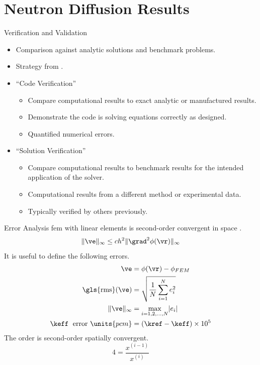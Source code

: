 \section{Neutron Diffusion Results}
\label{sec:diffusionResults}

\begin{frame}{Verification and Validation}
  \begin{itemize}
    \item Comparison against analytic solutions and benchmark problems.
    \item Strategy from \cite{oberkampf}.
    \item ``Code Verification''
      \begin{itemize}
        \item Compare computational results to exact analytic or manufactured
          results.
        \item Demonstrate the code is solving equations correctly as designed.
        \item Quantified numerical errors.
      \end{itemize}
    \item ``Solution Verification''
      \begin{itemize}
        \item Compare computational results to benchmark results for the
          intended application of the solver.
        \item Computational results from a different method or experimental
          data.
        \item Typically verified by others previously.
      \end{itemize}
  \end{itemize}
\end{frame}

\begin{frame}{Error Analysis}
  \gls{fem} with linear elements is second-order convergent in space
  \cite{textbookli}.
  \begin{equation} 
    \label{eq:error_bound}
    \|\ve\|_{\infty} \le c h^2 \| \grad^2 \phi(\vr) \|_{\infty}
  \end{equation}
  It is useful to define the following errors.
  \begin{align}
    \ve &= \phi(\vr) - \phi_{FEM} \\
    \label{eq:rms}
    \text{\gls{rms}}(\ve) &= \sqrt{\frac{1}{N} \sum_{i=1}^{N} e_i^2} \\
    \label{eq:infnorm}
    \|\ve\|_{\infty} &= \max_{i=1,2,\ldots,N} \lvert e_i \rvert \\
    \label{eq:keff_err}
    \keff \; \text{ error } \units{pcm} &= (\kref - \keff) \times 10^5
  \end{align}
  The order is second-order spatially convergent.
  \begin{equation}
    4 = \frac{x^{(i-1)}}{x^{(i)}}
  \end{equation}
\end{frame}


